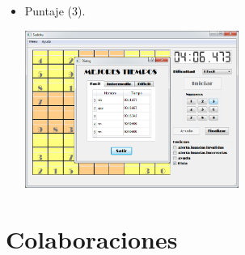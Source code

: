 \documentclass[12pt,oneside]{book}
\begin{document}
\begin{itemize}
\item   Puntaje (3).

	\includegraphics[width=0.55\textwidth]{./imagenes/puntaje.png}
\end{itemize}
\chapter{Colaboraciones}
\end{document}
